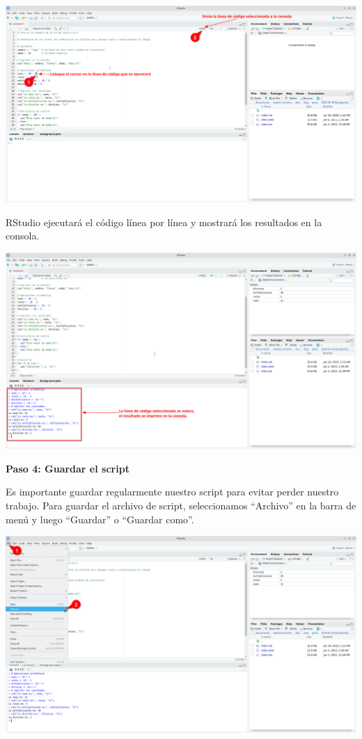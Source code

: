\documentclass[
  a4paper,
]{article}
\begin{document}
\includegraphics{images/Screenshot_20230611_005354.png}

RStudio ejecutará el código línea por línea y mostrará los resultados en
la consola.

\includegraphics{images/Screenshot_20230611_010256.png}

\textbf{Paso 4: Guardar el script}

Es importante guardar regularmente nuestro script para evitar perder
nuestro trabajo. Para guardar el archivo de script, seleccionamos
``Archivo'' en la barra de menú y luego ``Guardar'' o ``Guardar como''.

\includegraphics{images/Screenshot_20230611_010854.png}
\end{document}
